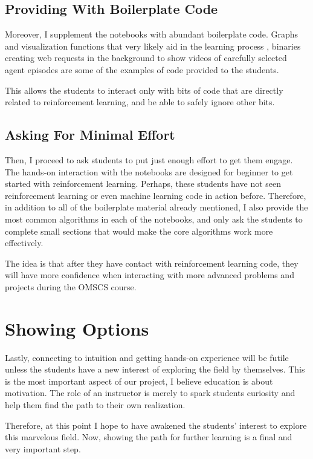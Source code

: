 \documentclass[11pt]{article} %
\begin{document}
\subsection{Providing With Boilerplate Code}

Moreover, I supplement the notebooks with abundant boilerplate code. Graphs and
visualization functions that very likely aid in the learning process \cite{visualization},
binaries creating web requests in the background to show videos of carefully
selected agent episodes are some of the examples of
code provided to the students.

This allows the students to interact only with bits of code that are directly
related to reinforcement learning, and be able to safely ignore other bits.

\subsection{Asking For Minimal Effort}

Then, I proceed to ask students to put just enough effort to get them engage.
The hands-on interaction with the notebooks are designed for beginner to get
started with reinforcement learning. Perhaps, these students have not seen
reinforcement learning or even machine learning code in action before. Therefore,
in addition to all of the boilerplate material already mentioned, I also
provide the most common algorithms in each of the notebooks, and
only ask the students to complete small sections that would make the core
algorithms work more effectively.

The idea is that after they have contact with reinforcement learning code, they
will have more confidence when interacting with more advanced problems and
projects during the OMSCS course.

\section{Showing Options}

Lastly, connecting to intuition and getting hands-on experience will be
futile unless the students have a new interest of exploring the field by
themselves. This is the most important aspect of our project, I believe
education is about motivation. The role of an instructor is merely to spark
students curiosity and help them find the path to their own realization.

Therefore, at this point I hope to have awakened the students' interest to
explore this marvelous field. Now, showing the path for further learning is
a final and very important step.
\end{document}

